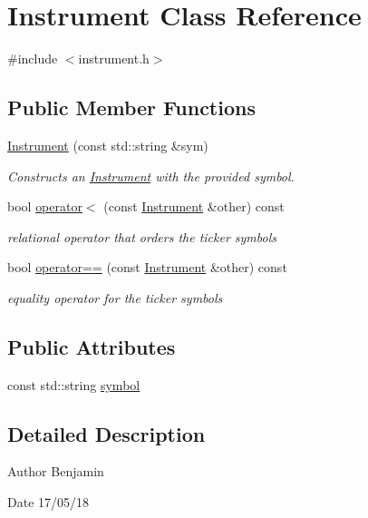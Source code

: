 \hypertarget{classInstrument}{}\section{Instrument Class Reference}
\label{classInstrument}


{\ttfamily \#include $<$instrument.\+h$>$}

\subsection*{Public Member Functions}
\begin{DoxyCompactItemize}
\item 
\hyperlink{classInstrument_af6112f02c5739bd166b78a1734e79b2c}{Instrument} (const std\+::string \&sym)
\begin{DoxyCompactList}\small\item\em Constructs an \hyperlink{classInstrument}{Instrument} with the provided symbol. \end{DoxyCompactList}\item 
bool \hyperlink{classInstrument_a8ffc6368e7b12588e422145f2b659f9e}{operator$<$} (const \hyperlink{classInstrument}{Instrument} \&other) const
\begin{DoxyCompactList}\small\item\em relational operator that orders the ticker symbols \end{DoxyCompactList}\item 
bool \hyperlink{classInstrument_a5fff991d72c20b0def886d743b6ae0b3}{operator==} (const \hyperlink{classInstrument}{Instrument} \&other) const
\begin{DoxyCompactList}\small\item\em equality operator for the ticker symbols \end{DoxyCompactList}\end{DoxyCompactItemize}
\subsection*{Public Attributes}
\begin{DoxyCompactItemize}
\item 
const std\+::string \hyperlink{classInstrument_a4c469c7cf9512a7b23eb1c26d94a0861}{symbol}
\end{DoxyCompactItemize}


\subsection{Detailed Description}
\begin{DoxyAuthor}{Author}
Benjamin 
\end{DoxyAuthor}
\begin{DoxyDate}{Date}
17/05/18 
\end{DoxyDate}


